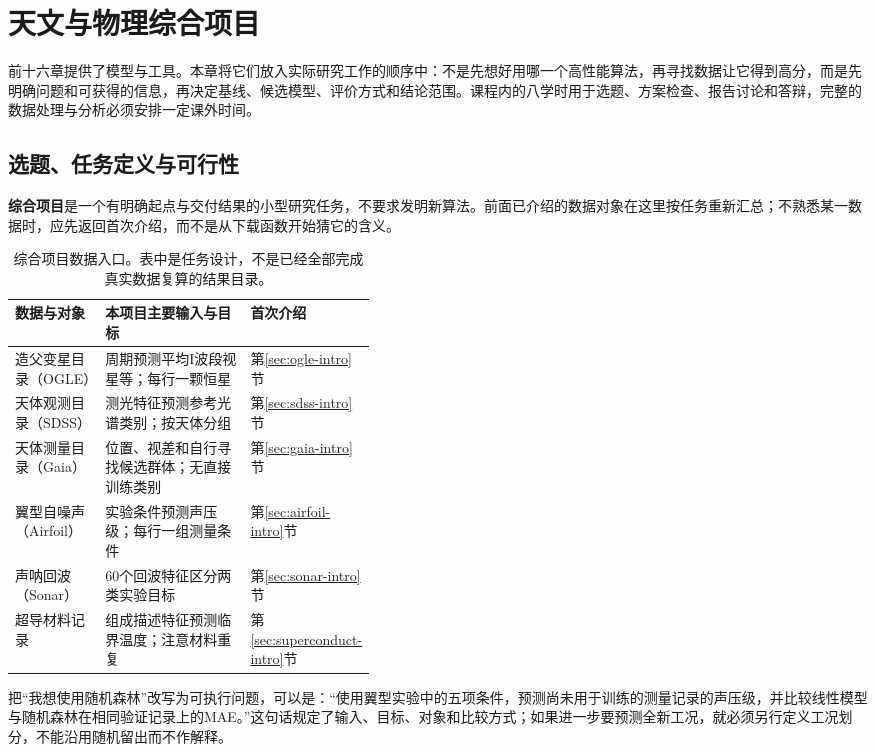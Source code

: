 \chapter{天文与物理综合项目}

前十六章提供了模型与工具。本章将它们放入实际研究工作的顺序中：不是先想好用哪一个高性能算法，再寻找数据让它得到高分，而是先明确问题和可获得的信息，再决定基线、候选模型、评价方式和结论范围。课程内的八学时用于选题、方案检查、报告讨论和答辩，完整的数据处理与分析必须安排一定课外时间。
\section{选题、任务定义与可行性}

\textbf{综合项目}是一个有明确起点与交付结果的小型研究任务，不要求发明新算法。前面已介绍的数据对象在这里按任务重新汇总；不熟悉某一数据时，应先返回首次介绍，而不是从下载函数开始猜它的含义。

\begin{table}[htbp]\centering\small
\begin{tabularx}{\linewidth}{p{0.25\linewidth}Xp{0.17\linewidth}}
\toprule 数据与对象 & 本项目主要输入与目标 & 首次介绍 \\\midrule
造父变星目录（OGLE） & 周期预测平均I波段视星等；每行一颗恒星 & 第\ref{sec:ogle-intro}节\\
天体观测目录（SDSS） & 测光特征预测参考光谱类别；按天体分组 & 第\ref{sec:sdss-intro}节\\
天体测量目录（Gaia） & 位置、视差和自行寻找候选群体；无直接训练类别 & 第\ref{sec:gaia-intro}节\\
翼型自噪声（Airfoil） & 实验条件预测声压级；每行一组测量条件 & 第\ref{sec:airfoil-intro}节\\
声呐回波（Sonar） & 60个回波特征区分两类实验目标 & 第\ref{sec:sonar-intro}节\\
超导材料记录 & 组成描述特征预测临界温度；注意材料重复 & 第\ref{sec:superconduct-intro}节\\
\bottomrule
\end{tabularx}
\caption{综合项目数据入口。表中是任务设计，不是已经全部完成真实数据复算的结果目录。}
\end{table}

把“我想使用随机森林”改写为可执行问题，可以是：“使用翼型实验中的五项条件，预测尚未用于训练的测量记录的声压级，并比较线性模型与随机森林在相同验证记录上的MAE。”这句话规定了输入、目标、对象和比较方式；如果进一步要预测全新工况，就必须另行定义工况划分，不能沿用随机留出而不作解释。

